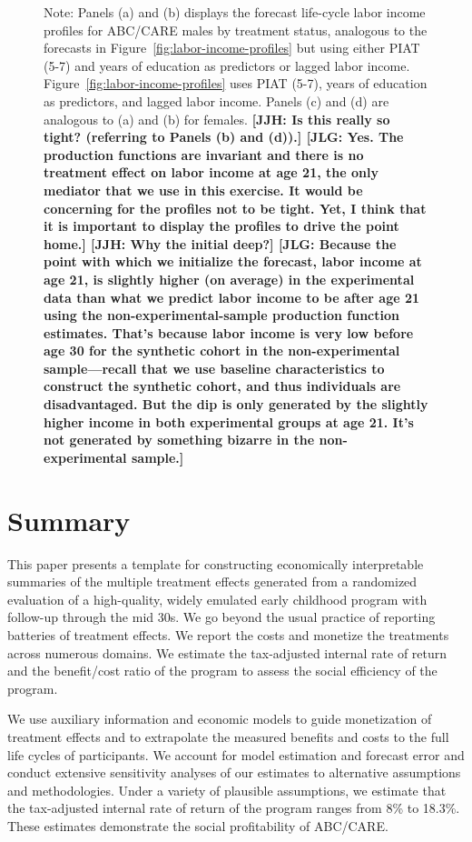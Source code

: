 \begin{figure}
Note: Panels (a) and (b) displays the forecast life-cycle labor income profiles for ABC/CARE males by treatment status, analogous to the forecasts in Figure~\ref{fig:labor-income-profiles} but using either PIAT (5-7) and years of education as predictors or lagged labor income. Figure~\ref{fig:labor-income-profiles} uses PIAT (5-7), years of education as predictors, and lagged labor income. Panels (c) and (d) are analogous to (a) and (b) for females. \textbf{[JJH: Is this really so tight? (referring to Panels (b) and (d)).] [JLG: Yes. The production functions are invariant and there is no treatment effect on labor income at age 21, the only mediator that we use in this exercise. It would be concerning for the profiles not to be tight. Yet, I think that it is important to display the profiles to drive the point home.] [JJH: Why the initial deep?] [JLG: Because the point with which we initialize the forecast, labor income at age 21, is slightly higher (on average) in the experimental data than what we predict labor income to be after age 21 using the non-experimental-sample production function estimates. That’s because labor income is very low before age 30 for the synthetic cohort in the non-experimental sample—recall that we use baseline characteristics to construct the synthetic cohort, and thus individuals are disadvantaged. But the dip is only generated by the slightly higher income in both experimental groups at age 21. It’s not generated by something bizarre in the non-experimental sample.]}
\end{figure}

\section{Summary} \label{section:conclusion}

\noindent This paper presents a template for constructing economically interpretable summaries of the multiple treatment effects generated from a randomized evaluation of a high-quality, widely emulated early childhood program with follow-up through the mid 30s. We go beyond the usual practice of reporting batteries of treatment effects. We report the costs and monetize the treatments across numerous domains. We estimate the tax-adjusted internal rate of return and the benefit/cost ratio of the program to assess the social efficiency of the program.

We use auxiliary information and economic models to guide monetization of treatment effects and to extrapolate the measured benefits and costs to the full life cycles of participants. We account for model estimation and forecast error and conduct extensive sensitivity analyses of our estimates to alternative assumptions and methodologies. Under a variety of plausible assumptions, we estimate that the tax-adjusted internal rate of return of the program ranges from 8\% to 18.3\%. These estimates demonstrate the social profitability of ABC/CARE.

